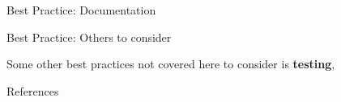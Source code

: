 \documentclass[final]{beamer}
\newlength{\sepwidth}
\newlength{\colwidth}
\newcommand{\separatorcolumn}{\begin{column}{\sepwidth}\end{column}}
\begin{document}
\begin{frame}[t]
\begin{columns}[t]
\begin{column}{\colwidth}
\begin{block}{Best Practice: Documentation}
  \end{block}

  \begin{block}{Best Practice: Others to consider}

    Some other best practices not covered here to consider is \textbf{testing},


  \end{block}

  \begin{block}{References}

    \nocite{*}
    \footnotesize{}

  \end{block}

\end{column}

\separatorcolumn
\end{columns}
\end{frame}
\end{document}
